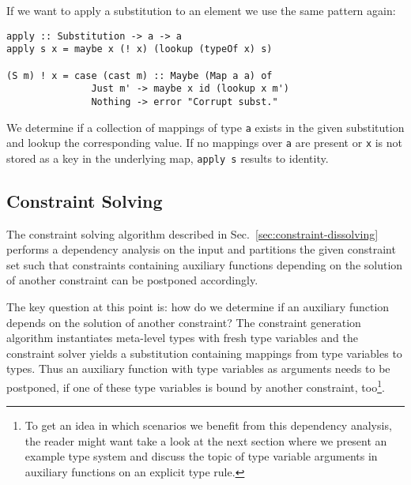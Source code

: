 If we want to apply a substitution to an element we use the same
pattern again:
\begin{lstlisting}
apply :: Substitution -> a -> a
apply s x = maybe x (! x) (lookup (typeOf x) s)

(S m) ! x = case (cast m) :: Maybe (Map a a) of
               Just m' -> maybe x id (lookup x m')
               Nothing -> error "Corrupt subst."
\end{lstlisting}
We determine if a collection of mappings of type \texttt{a} exists in
the given substitution and lookup the corresponding value. If no
mappings over \texttt{a} are present or \texttt{x} is not stored as a
key in the underlying map, \texttt{apply s} results to identity.


\subsection{Constraint Solving}

The constraint solving algorithm described in
Sec.~\ref{sec:constraint-dissolving} performs a dependency analysis on
the input and partitions the given constraint set such that
constraints containing auxiliary functions depending on the solution
of another constraint can be postponed accordingly.

The key question at this point is: how do we determine if an auxiliary
function depends on the solution of another constraint? The
constraint generation algorithm instantiates meta-level types with
fresh type variables and the constraint solver yields a substitution
containing mappings from type variables to types. Thus an auxiliary
function with type variables as arguments needs to be postponed, if
one of these type variables is bound by another constraint,
too\footnote{To get an idea in which scenarios we benefit from this
  dependency analysis, the reader might want take a look at the next
  section where we present an example type system and discuss the
  topic of type variable arguments in auxiliary functions on an
  explicit type rule.}.

